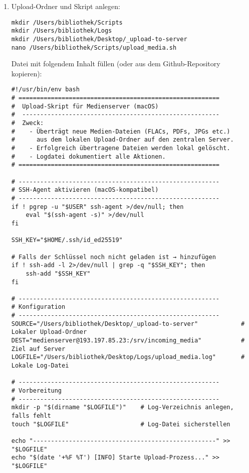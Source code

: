 \documentclass[12pt,a4paper]{report}
\begin{document}
  \begin{enumerate}
    \item Upload-Ordner und Skript anlegen:
    \begin{verbatim}
mkdir /Users/bibliothek/Scripts
mkdir /Users/bibliothek/Logs
mkdir /Users/bibliothek/Desktop/_upload-to-server
nano /Users/bibliothek/Scripts/upload_media.sh
    \end{verbatim}

    Datei mit folgendem Inhalt füllen (oder aus dem Github-Repository kopieren):

    \begin{verbatim}
#!/usr/bin/env bash
# ========================================================
#  Upload-Skript für Medienserver (macOS)
#  -------------------------------------------------------
#  Zweck:
#    - Überträgt neue Medien-Dateien (FLACs, PDFs, JPGs etc.)
#      aus dem lokalen Upload-Ordner auf den zentralen Server.
#    - Erfolgreich übertragene Dateien werden lokal gelöscht.
#    - Logdatei dokumentiert alle Aktionen.
# ========================================================

# --------------------------------------------------------
# SSH-Agent aktivieren (macOS-kompatibel)
# --------------------------------------------------------
if ! pgrep -u "$USER" ssh-agent >/dev/null; then
    eval "$(ssh-agent -s)" >/dev/null
fi

SSH_KEY="$HOME/.ssh/id_ed25519"

# Falls der Schlüssel noch nicht geladen ist → hinzufügen
if ! ssh-add -l 2>/dev/null | grep -q "$SSH_KEY"; then
    ssh-add "$SSH_KEY"
fi

# --------------------------------------------------------
# Konfiguration
# --------------------------------------------------------
SOURCE="/Users/bibliothek/Desktop/_upload-to-server"            # Lokaler Upload-Ordner
DEST="medienserver@193.197.85.23:/srv/incoming_media"           # Ziel auf Server
LOGFILE="/Users/bibliothek/Desktop/Logs/upload_media.log"       # Lokale Log-Datei

# --------------------------------------------------------
# Vorbereitung
# --------------------------------------------------------
mkdir -p "$(dirname "$LOGFILE")"    # Log-Verzeichnis anlegen, falls fehlt
touch "$LOGFILE"                    # Log-Datei sicherstellen

echo "---------------------------------------------------" >> "$LOGFILE"
echo "$(date '+%F %T') [INFO] Starte Upload-Prozess..." >> "$LOGFILE"


\end{verbatim}
\end{enumerate}
\end{document}
